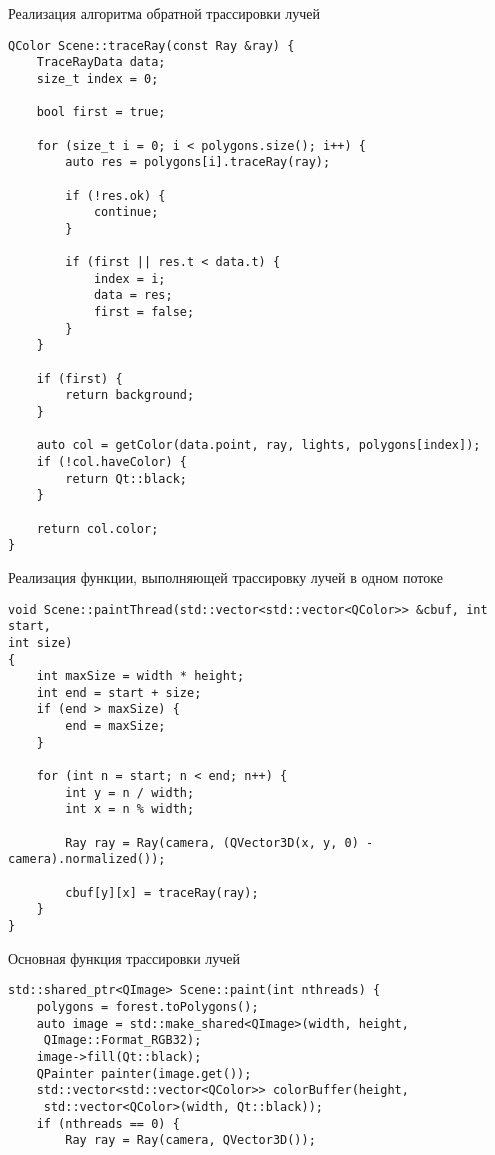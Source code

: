\begin{code}
\caption{Реализация алгоритма обратной трассировки лучей}
\label{code:start}
\begin{verbatim}
QColor Scene::traceRay(const Ray &ray) {
    TraceRayData data;
    size_t index = 0;

    bool first = true;

    for (size_t i = 0; i < polygons.size(); i++) {
        auto res = polygons[i].traceRay(ray);

        if (!res.ok) {
            continue;
        }

        if (first || res.t < data.t) {
            index = i;
            data = res;
            first = false;
        }
    }

    if (first) {
        return background;
    }

    auto col = getColor(data.point, ray, lights, polygons[index]);
    if (!col.haveColor) {
        return Qt::black;
    }

    return col.color;
}
\end{verbatim}
\end{code}

\newpage

\begin{code}
\caption{Реализация функции, выполняющей трассировку лучей в одном потоке}
\begin{verbatim}
void Scene::paintThread(std::vector<std::vector<QColor>> &cbuf, int start,
int size)
{
    int maxSize = width * height;
    int end = start + size;
    if (end > maxSize) {
        end = maxSize;
    }

    for (int n = start; n < end; n++) {
        int y = n / width;
        int x = n % width;

        Ray ray = Ray(camera, (QVector3D(x, y, 0) - camera).normalized());

        cbuf[y][x] = traceRay(ray);
    }
}
\end{verbatim}
\end{code}

\begin{code}
\caption{Основная функция трассировки лучей}
\label{code:prev}
\begin{verbatim}
std::shared_ptr<QImage> Scene::paint(int nthreads) {
    polygons = forest.toPolygons();
    auto image = std::make_shared<QImage>(width, height,
     QImage::Format_RGB32);
    image->fill(Qt::black);
    QPainter painter(image.get());
    std::vector<std::vector<QColor>> colorBuffer(height,
     std::vector<QColor>(width, Qt::black));
    if (nthreads == 0) {
        Ray ray = Ray(camera, QVector3D());
\end{verbatim}
\end{code}

